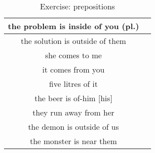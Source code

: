 \begin{table}[H]
\begin{tabular}{|c|M{5.0cm}|}
  \midrule
  the problem is inside of you (pl.) & \\
  \midrule
  the solution is outside of them & \\
  \midrule
  she comes to me & \\
  \midrule
  it comes from you & \\
  \midrule
  five litres of it & \\
  \midrule
  the beer is of-him $[$his$]$ & \\
  \midrule
  they run away from her & \\
  \midrule
  the demon is outside of us & \\
  \midrule
  the monster is near them & \\
  \bottomrule
\end{tabular}
\label{exercise_prepositions}
\caption{Exercise: prepositions}
\end{table}

\newpage
